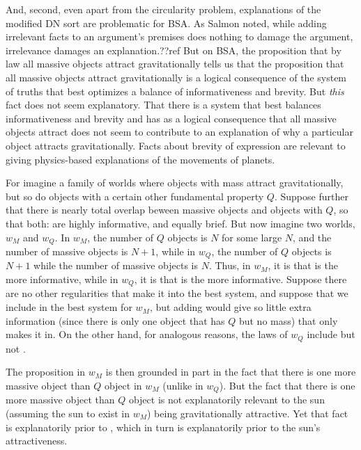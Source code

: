 And, second, even apart from the circularity problem, explanations of the modified DN sort are problematic for BSA.
As Salmon noted, while adding irrelevant facts to an argument's premises does nothing to damage the argument, irrelevance
damages an explanation.??ref But on BSA, the proposition that by law all massive objects attract gravitationally tells us
that the proposition that all massive objects attract gravitationally is a logical consequence of the system
of truths that best optimizes a balance of informativeness and brevity. But \textit{this} fact does not seem explanatory.
That there is a system that best balances informativeness and brevity and has as a logical consequence that all massive
objects attract does not seem to contribute to an explanation of why a particular object attracts gravitationally. Facts 
about brevity of expression are relevant to giving physics-based explanations of the movements of planets. 

For imagine a family of worlds where objects with mass attract gravitationally, but so do objects with a certain other 
fundamental property $Q$. 
Suppose further that there is nearly total overlap beween massive objects and objects with $Q$, so that both:
are highly informative, and equally brief. But now imagine two worlds, $w_M$ and $w_Q$. In $w_M$, the number of $Q$
objects is $N$ for some large $N$, and the number of massive objects is $N+1$, while in $w_Q$, the number of $Q$ objects
is $N+1$ while the number of massive objects is $N$. Thus, in $w_M$, it is  that is the more informative,
while in $w_Q$, it is  that is the more informative. Suppose there are no other regularities that make it
into the best system, and suppose that we include  in the best system for $w_M$, but adding 
would give so little extra information (since there is only one object that has $Q$ but no mass) that only  makes 
it in. On the other hand, for analogous reasons, the laws of $w_Q$ include  but not . 

The proposition  in $w_M$ is then grounded in part in the fact that there is one more massive object
than $Q$ object in $w_M$ (unlike in $w_Q$). But the fact that there is one more massive object than $Q$ object is 
not explanatorily relevant to the sun (assuming the sun to exist in $w_M$) being gravitationally attractive. 
Yet that fact is explanatorily prior to , which in turn is explanatorily prior to the sun's attractiveness.

